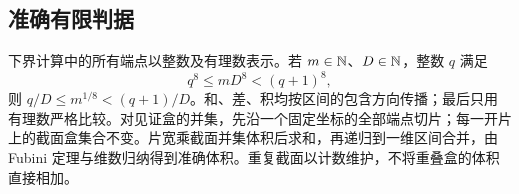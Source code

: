 \subsection{准确有限判据}
下界计算中的所有端点以整数及有理数表示。若 $m\in\mathbb{N}$、$D\in\mathbb{N}$，整数 $q$ 满足
\begin{equation}\label{pre:root}
 q^8\le mD^8<(q+1)^8,
\end{equation}
则 $q/D\le m^{1/8}<(q+1)/D$。和、差、积均按区间的包含方向传播；最后只用有理数严格比较。对见证盒的并集，先沿一个固定坐标的全部端点切片；每一开片上的截面盒集合不变。片宽乘截面并集体积后求和，再递归到一维区间合并，由 Fubini 定理与维数归纳得到准确体积。重复截面以计数维护，不将重叠盒的体积直接相加。
